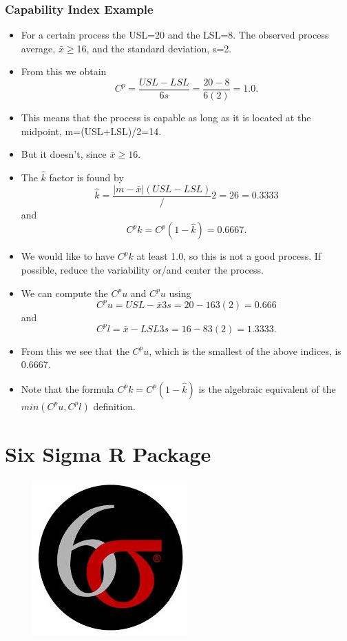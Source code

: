 \documentclass[]{article}
\begin{document}
{\subsubsection{Capability Index Example}
\begin{itemize}
\item For a certain process the USL=20 and the LSL=8. The observed process average, $\bar{x}$$\geq$16, and the standard deviation, s=2. 
\item 
From this we obtain
\[C^p=\frac{USL-LSL}{6s}= \frac{20−8}{6(2)}=1.0.\]
\item This means that the process is capable as long as it is located at the midpoint, m=(USL+LSL)/2=14.
\item But it doesn't, since $\bar{x}\geq16$. 
\item The $\hat{k}$ factor is found by
\[\hat{k}=\frac{|m−\bar{x}|(USL−LSL)}/2=26=0.3333\]
and
\[C^pk=C^p(1−\hat{k})=0.6667.\]
\item We would like to have $C^pk$ at least 1.0, so this is not a good process. If possible, reduce the variability or/and center the process. \item We can compute the $C^pu$ and $C^pu$ using
\[C^pu=USL−\bar{x}3s=20-163(2)=0.666\]
and
\[C^pl=\bar{x}-LSL3s=16−83(2)=1.3333.\]
\item From this we see that the $C^pu$, which is the smallest of the above indices, is 0.6667. 
\item Note that the formula $C^pk=C^p(1−\hat{k})$ is the algebraic equivalent of the $min(C^pu,C^pl)$ definition.
\end{itemize}
}
\newpage






\newpage
\section{Six Sigma R Package}
\begin{figure}[h!]
\centering
\includegraphics[width=0.4\linewidth]{./sixsigmalogo}
\caption{}
\label{fig:sixsigmalogo}
\end{figure}
\end{document}

